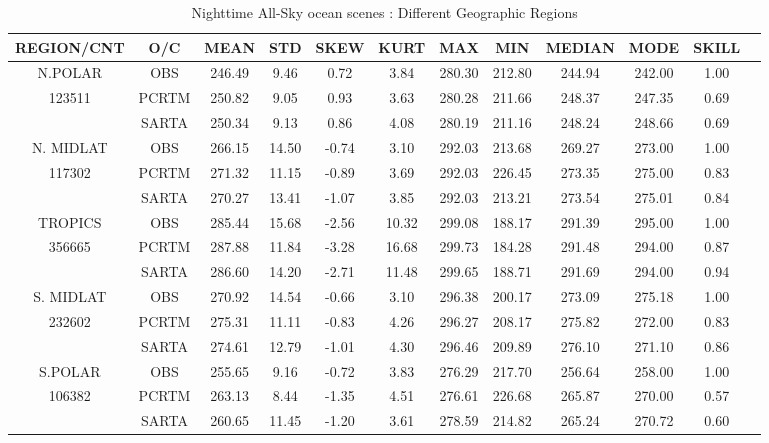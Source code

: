 \documentclass[agupp]{aguplus}              %
\begin{document}
\begin{article}
\begin{center}
\begin{table}[ht]
{\small
\hfill{}
\begin{tabular}{cccccccccccc} %
\hline\hline %
 REGION/CNT    & O/C & MEAN  & STD & SKEW & KURT & MAX & MIN & MEDIAN & MODE & SKILL \\
\hline %
N.POLAR   & OBS   & 246.49 &  9.46  &  0.72 &  3.84 & 280.30 & 212.80 & 244.94 & 242.00 &  1.00 \\
   123511        & PCRTM & 250.82 &  9.05  &  0.93 &  3.63 & 280.28 & 211.66 & 248.37 & 247.35 &  0.69\\ 
              & SARTA & 250.34 &  9.13  &  0.86 &  4.08 & 280.19 & 211.16 & 248.24 & 248.66 &  0.69 \\
\hline %
N. MIDLAT      & OBS   & 266.15 & 14.50  & -0.74 &  3.10 & 292.03 & 213.68 & 269.27 & 273.00 &  1.00 \\
   117302        & PCRTM & 271.32 & 11.15  & -0.89 &  3.69 & 292.03 & 226.45 & 273.35 & 275.00 &  0.83 \\
              & SARTA & 270.27 & 13.41  & -1.07 &  3.85 & 292.03 & 213.21 & 273.54 & 275.01 &  0.84 \\
\hline
TROPICS   & OBS   & 285.44 & 15.68  & -2.56 & 10.32 & 299.08 & 188.17 & 291.39 & 295.00 &  1.00 \\
   356665        & PCRTM & 287.88 & 11.84  & -3.28 & 16.68 & 299.73 & 184.28 & 291.48 & 294.00 &  0.87\\ 
              & SARTA & 286.60 & 14.20  & -2.71 & 11.48 & 299.65 & 188.71 & 291.69 & 294.00 &  0.94 \\
\hline
S. MIDLAT   & OBS   & 270.92 & 14.54  & -0.66 &  3.10 & 296.38 & 200.17 & 273.09 & 275.18 &  1.00 \\
   232602        & PCRTM & 275.31 & 11.11  & -0.83 &  4.26 & 296.27 & 208.17 & 275.82 & 272.00 &  0.83\\ 
              & SARTA & 274.61 & 12.79  & -1.01 &  4.30 & 296.46 & 209.89 & 276.10 & 271.10 &  0.86 \\
\hline
S.POLAR   & OBS   & 255.65 &  9.16  & -0.72 &  3.83 & 276.29 & 217.70 & 256.64 & 258.00 &  1.00 \\
   106382        & PCRTM & 263.13 &  8.44  & -1.35 &  4.51 & 276.61 & 226.68 & 265.87 & 270.00 &  0.57\\ 
              & SARTA & 260.65 & 11.45  & -1.20 &  3.61 & 278.59 & 214.82 & 265.24 & 270.72 &  0.60 \\
\hline %
\end{tabular}}
\hfill{}
\caption{Nighttime All-Sky ocean scenes : Different Geographic Regions}
\label{table:georegions_ocean} %
\end{table}
\end{center}


\end{article}
\end{document}
